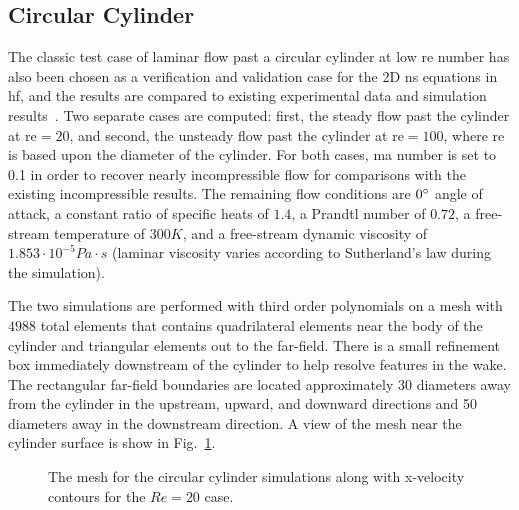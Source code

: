 \graphicspath{{\aiaadir /figures_cylinder/}}%

\subsection{Circular Cylinder}

The classic test case of laminar flow past a circular cylinder at low \gls{re} number has also been chosen as a verification and validation case for the 2D \gls{ns} equations in \gls{hf}, and the results are compared to existing experimental data and simulation results~\cite{park1998}. Two separate cases are computed: first, the steady flow past the cylinder at \gls{re}$= 20$, and second, the unsteady flow past the cylinder at \gls{re}$= 100$, where \gls{re} is based upon the diameter of the cylinder. For both cases, \gls{ma} number is set to 0.1 in order to recover nearly incompressible flow for comparisons with the existing incompressible results. The remaining flow conditions are $0^{\circ}$ angle of attack, a constant ratio of specific heats of $1.4$, a Prandtl number of $0.72$, a free-stream temperature of $300K$, and a free-stream dynamic viscosity of $1.853\cdot 10^{-5} Pa \cdot s$ (laminar viscosity varies according to Sutherland's law during the simulation).

The two simulations are performed with third order polynomials on a mesh with $4988$ total elements that contains quadrilateral elements near the body of the cylinder and triangular elements out to the far-field. There is a small refinement box immediately downstream of the cylinder to help resolve features in the wake. The rectangular far-field boundaries are located approximately 30 diameters away from the cylinder in the upstream, upward, and downward directions and 50 diameters away in the downstream direction. A view of the mesh near the cylinder surface is show in Fig.~\ref{cylinder_1}.

\begin{figure}

    
  \caption{The mesh for the circular cylinder simulations along with x-velocity contours for the $Re = 20$ case.}
  \label{cylinder_1}
\end{figure}

